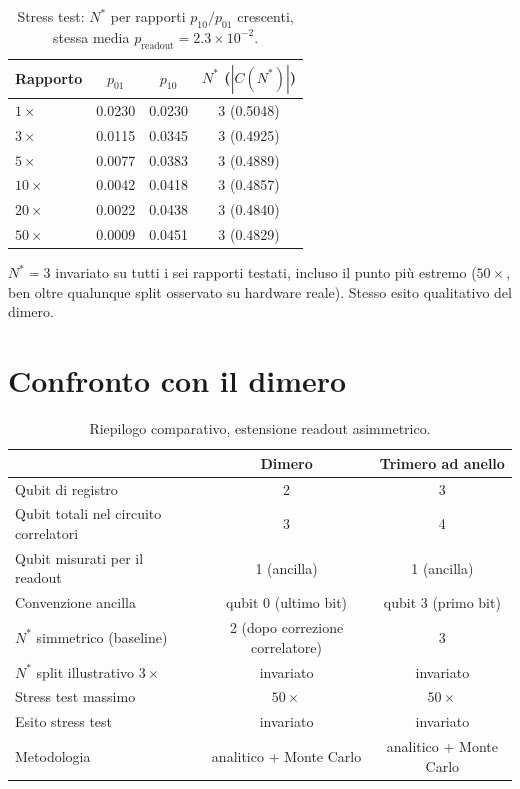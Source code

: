 \documentclass[11pt,a4paper]{article}
\begin{document}
\begin{table}[htbp]
\centering
\caption{Stress test: $N^*$ per rapporti $p_{10}/p_{01}$ crescenti, stessa media
$p_\text{readout}=2.3\times10^{-2}$.}
\begin{tabular}{lccc}
\toprule
Rapporto & $p_{01}$ & $p_{10}$ & $N^*$ ($|C(N^*)|$) \\
\midrule
$1\times$ & 0.0230 & 0.0230 & 3 (0.5048) \\
$3\times$ & 0.0115 & 0.0345 & 3 (0.4925) \\
$5\times$ & 0.0077 & 0.0383 & 3 (0.4889) \\
$10\times$ & 0.0042 & 0.0418 & 3 (0.4857) \\
$20\times$ & 0.0022 & 0.0438 & 3 (0.4840) \\
$50\times$ & 0.0009 & 0.0451 & 3 (0.4829) \\
\bottomrule
\end{tabular}
\end{table}

$N^*=3$ invariato su tutti i sei rapporti testati, incluso il punto più estremo ($50\times$, ben
oltre qualunque split osservato su hardware reale). Stesso esito qualitativo del dimero.

\section{Confronto con il dimero}

\begin{table}[htbp]
\centering
\caption{Riepilogo comparativo, estensione readout asimmetrico.}
\begin{tabular}{lcc}
\toprule
& Dimero & Trimero ad anello \\
\midrule
Qubit di registro & 2 & 3 \\
Qubit totali nel circuito correlatori & 3 & 4 \\
Qubit misurati per il readout & 1 (ancilla) & 1 (ancilla) \\
Convenzione ancilla & qubit 0 (ultimo bit) & qubit 3 (primo bit) \\
$N^*$ simmetrico (baseline) & 2 (dopo correzione correlatore) & 3 \\
$N^*$ split illustrativo $3\times$ & invariato & invariato \\
Stress test massimo & $50\times$ & $50\times$ \\
Esito stress test & invariato & invariato \\
Metodologia & analitico + Monte Carlo & analitico + Monte Carlo \\
\bottomrule
\end{tabular}
\end{table}
\end{document}
